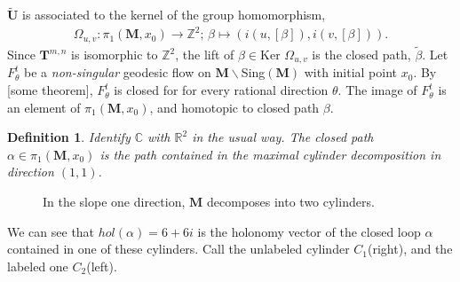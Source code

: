 \documentclass[]{article}
\newtheorem{Def}{Definition}[section]
\begin{document}
$\tilde{\mathbf{U}}$ is associated to the kernel of the group homomorphism,
\begin{align}
\Omega_{u,v}:\pi_1(\mathbf{M},x_0)\rightarrow \mathbb{Z}^2 \text{; } \beta\mapsto(i(u,[\beta]),i(v,[\beta])).
\end{align}
Since $\mathbf{T}^{m,n}$ is isomorphic to $\mathbb{Z}^2$, the lift of $\beta\in \text{Ker } \Omega_{u,v}$ is the closed path, $\tilde{\beta}$. Let $F^t_\theta$ be a \emph{non-singular} geodesic flow on $\mathbf{M}\backslash$Sing$(\mathbf M)$ with initial point $x_0$. By [some theorem], $F^t_\theta$ is closed for for every rational direction $\theta$. The image of $F^t_\theta$ is an element of $\pi_1(\mathbf M, x_0)$, and homotopic to closed path $\beta$. 

\begin{Def} Identify $\mathbb C$ with $\mathbb{R}^2$ in the usual way. The closed path $\alpha\in\pi_1(\mathbf M, x_0)$ is the path contained in the maximal cylinder decomposition in direction $(1,1)$.
\end{Def}

\begin{figure}[H]
\centering

\caption{In the slope one direction, $\mathbf M$ decomposes into two cylinders.}
\end{figure}

We can see that $hol(\alpha)=6+6i$ is the holonomy vector of the closed loop $\alpha$ contained in one of these cylinders. Call the unlabeled cylinder $C_1$(right), and the labeled one $C_2$(left).
\end{document}
